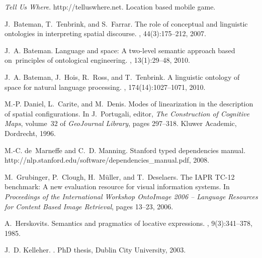 \documentclass{acm_proc_article-sp}
\begin{document}
%

\begin{thebibliography}{10}

\textit{Tell Us Where}.
\newblock http://telluswhere.net.
\newblock Location based mobile game.

J.~Bateman, T.~Tenbrink, and S.~Farrar.
\newblock The role of conceptual and linguistic ontologies in interpreting
  spatial discourse.
, 44(3):175--212, 2007.

J.~A. Bateman.
\newblock Language and space: A two-level semantic approach based
  on principles of ontological engineering.
, 13(1):29--48, 2010.

J.~A. Bateman, J.~Hois, R.~Ross, and T.~Tenbrink.
\newblock A linguistic ontology of space for natural language processing.
, 174(14):1027--1071, 2010.

M.-P. Daniel, L.~Carite, and M.~Denis.
\newblock Modes of linearization in the description of spatial configurations.
\newblock In J.~Portugali, editor, {\em The Construction of Cognitive Maps},
  volume~32 of {\em GeoJournal Library}, pages 297--318. Kluwer Academic,
  Dordrecht, 1996.

M.-C. de~Marneffe and C.~D. Manning.
\newblock Stanford typed dependencies manual.
\newblock http://nlp.stanford.edu/software/dependencies\_manual.pdf, 2008.

M.~Grubinger, P.~Clough, H.~M{\"u}ller, and T.~Deselaers.
\newblock The {IAPR TC}-12 benchmark: A new evaluation resource for visual
  information systems.
\newblock In {\em Proceedings of the International Workshop OntoImage 2006 --
  Language Resources for Content Based Image Retrieval}, pages 13--23, 2006.

A.~Herskovits.
\newblock Semantics and pragmatics of locative expressions.
, 9(3):341--378, 1985.

J.~D. Kelleher.
.
\newblock PhD thesis, Dublin City University, 2003.


\end{thebibliography}
\end{document}
